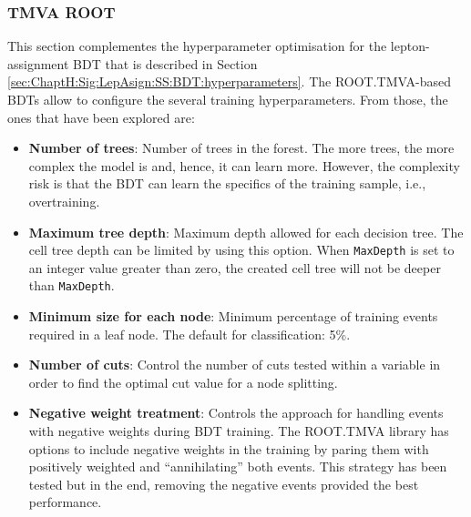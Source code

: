 \subsubsection{TMVA ROOT}
This section complementes the hyperparameter optimisation for the lepton-assignment BDT
that is described in Section \ref{sec:ChaptH:Sig:LepAsign:SS:BDT:hyperparameters}.
The ROOT.TMVA-based BDTs allow to configure the several training hyperparameters.
From those, the ones that have been explored are:
\begin{itemize}
	\item \textbf{Number of trees}: Number of trees in the forest. The more trees, the more complex the 
		model is and, hence, it can learn more. However, the complexity risk is that the BDT can learn 
		the specifics of the training sample, i.e., overtraining.
		
	\item \textbf{Maximum tree depth}: Maximum depth allowed for each decision tree.
		The cell tree depth can be limited by using this option. When \texttt{MaxDepth} 
		is set to an integer value greater than zero, the created cell tree will not be deeper 
		than \texttt{MaxDepth}.  
			
	\item \textbf{Minimum size for each node}: Minimum percentage of training events required in a leaf node.
	 	The default for classification: 5\%. 
		
	\item \textbf{Number of cuts}: Control the number of cuts tested within 
		a variable in order to find the optimal cut value for a node splitting.
		
	\item \textbf{Negative weight treatment}: Controls the approach for handling 
		events with negative weights during BDT training. The ROOT.TMVA library has options
		to include negative weights in the training by paring them with positively weighted
		and ``annihilating'' both events. This strategy has been tested but in the end, removing the negative
		events provided the best performance. 

		
		

\end{itemize}
